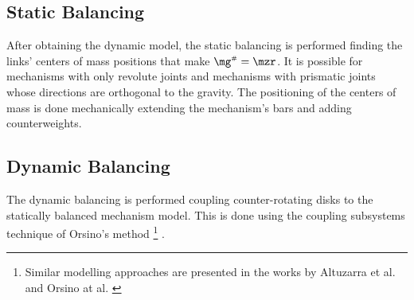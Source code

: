 \documentclass[a4paper,11pt,brazil,fleqn]{article}
\begin{document}
\subsection{Static Balancing}\label{S02-2}

After obtaining the dynamic model, the static balancing is performed finding the links' centers of mass positions that make $\mg\ssh = \mzr$. It is possible for mechanisms with only revolute joints and mechanisms with prismatic joints whose directions are orthogonal to the gravity. The positioning of the centers of mass is done mechanically extending the mechanism's bars and adding counterweights.

\subsection{Dynamic Balancing}\label{S02-3}

The dynamic balancing is performed coupling counter-rotating disks to the statically balanced mechanism model. This is done using the coupling subsystems technique of Orsino's method \footnote{Similar modelling approaches are presented in the works by Altuzarra et al. \cite{20altuzarra} and Orsino at al. \cite{21orsino}} \cite{22orsino,23orsino}.
\end{document}
